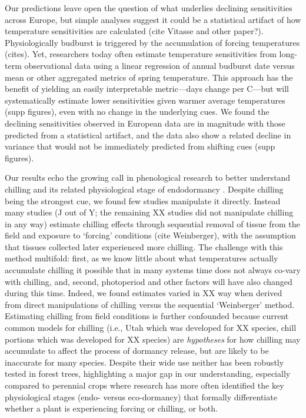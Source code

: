 \documentclass{article}
\begin{document}
\par Our predictions leave open the question of what underlies declining sensitivities across Europe, but simple analyses suggest it could be a statistical artifact of how temperature sensitivities are calculated (cite Vitasse and other paper?). Physiologically budburst is triggered by the accumulation of forcing temperatures (cites). Yet, researchers today often estimate temperature sensitivities from long-term observational data using a linear regression of annual budburst date  versus mean or other aggregated metrics of spring temperature. This approach has the benefit of yielding an easily interpretable metric---days change per \degree C---but will systematically estimate lower sensitivities given warmer average temperatures (supp figures), even with no change in the underlying cues. We found the declining  sensitivities observed in European data are in magnitude with those predicted from a statistical artifact, and the data also show a related decline in variance that would not be immediately predicted from shifting cues (supp figures). %

\par Our results echo the growing call in phenological research to better understand chilling and its related physiological stage of endodormancy \citep{chuine2016}.  Despite chilling being the strongest cue, we found few studies manipulate it directly. Instead many studies (J out of Y; the remaining XX studies did not manipulate chilling in any way) estimate chilling effects through sequential removal of tissue from the field and exposure to `forcing' conditions (cite Weinberger), with the assumption that tissues collected later experienced more chilling. The challenge with this method multifold: first, as we know little about what temperatures actually accumulate chilling it possible that in many systems time does not always co-vary with chilling, and, second, photoperiod and other factors will have also changed during this time. Indeed, we found estimates varied in XX way when derived from direct manipulations of chilling versus the sequential `Weinberger' method. Estimating chilling from field conditions is further confounded because current common models for chilling (i.e., Utah which was developed for XX species, chill portions which was developed for XX species) are \emph{hypotheses} for how chilling may accumulate to affect the process of dormancy release, but are likely to be inaccurate for many species. Despite their wide use neither has been robustly tested in forest trees, highlighting a major gap in our understanding, especially compared to perennial crops where research has more often identified the key physiological stages (endo- versus eco-dormancy) that formally differentiate whether a plant is experiencing forcing or chilling, or both. 
\end{document}
